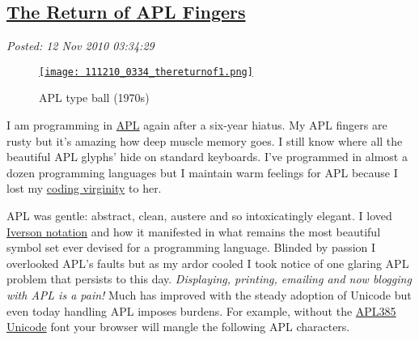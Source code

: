 %

\subsection*{\href{https://bakerjd99.wordpress.com/2010/11/12/the-return-of-apl-fingers-2/}{The Return of APL Fingers}}


\noindent\emph{Posted: 12 Nov 2010 03:34:29}
\vspace{6pt}



\begin{figure}
\centering
\href{http://blogs.mysql.com/kaj/2009/01/20/seven-useless-facts/}{\texttt{[image: 111210\_0334\_thereturnof1.png]}}
\caption{APL type ball (1970s)}
\label{fig:835X0}
\end{figure}

I am programming in
\href{http://en.wikipedia.org/wiki/APL\_(programming\_language)}{APL}
again after a six-year hiatus. My APL fingers are rusty but it's amazing
how deep muscle memory goes. I still know where all the beautiful APL
glyphs' hide on standard keyboards. I've programmed in almost a dozen
programming languages but I maintain warm feelings for APL because I
lost my
\href{http://www.codesqueeze.com/the-ultimate-top-25-chuck-norris-the-programmer-jokes/}{coding
virginity} to her.

APL was gentle: abstract, clean, austere and so intoxicatingly elegant.
I loved \href{http://en.wikipedia.org/wiki/Kenneth\_E.\_Iverson}{Iverson
notation} and how it manifested in what remains the most beautiful
symbol set ever devised for a programming language. Blinded by passion I
overlooked APL's faults but as my ardor cooled I took notice of one
glaring APL problem that persists to this day. \emph{Displaying,
printing, emailing and now blogging with APL is a pain!} Much has
improved with the steady adoption of Unicode but even today handling APL
imposes burdens. For example, without the
\href{http://www.vector.org.uk/?area=fonts}{APL385 Unicode} font your
browser will mangle the following APL characters.

